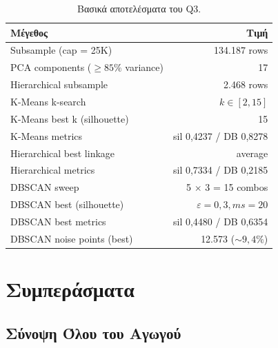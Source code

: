 \documentclass[12pt,a4paper,twoside]{book}
\begin{document}
\begin{table}[H]
    \centering
    \begin{tabular}{lr}
        \toprule
        \textbf{Μέγεθος}                                  & \textbf{Τιμή} \\
        \midrule
        Subsample (cap = 25K)                             & 134.187 rows  \\
        PCA components (\(\geq 85\%\) variance)           & 17            \\
        Hierarchical subsample                            & 2.468 rows    \\
        K-Means k-search                                  & \(k \in [2,15]\) \\
        K-Means best k (silhouette)                       & 15            \\
        K-Means metrics                                   & sil 0,4237 / DB 0,8278 \\
        Hierarchical best linkage                         & average       \\
        Hierarchical metrics                              & sil 0,7334 / DB 0,2185 \\
        DBSCAN sweep                                      & 5 \(\times\) 3 = 15 combos \\
        DBSCAN best (silhouette)                          & \(\varepsilon=0{,}3, ms=20\) \\
        DBSCAN best metrics                               & sil 0,4480 / DB 0,6354 \\
        DBSCAN noise points (best)                        & 12.573 (\(\sim 9{,}4\%\)) \\
        \bottomrule
    \end{tabular}
    \caption{Βασικά αποτελέσματα του Q3.}\label{tab:q3_summary}
\end{table}

\chapter{Συμπεράσματα}\label{ch:conclusions}

\section{Σύνοψη Όλου του Αγωγού}
\end{document}
